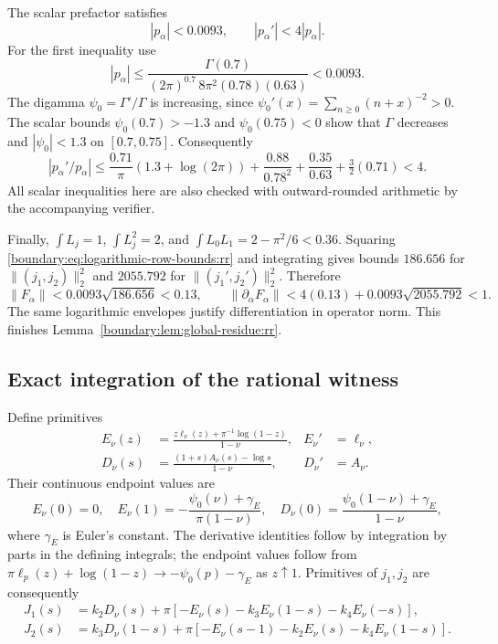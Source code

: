 The scalar prefactor satisfies
\begin{equation}\label{boundary:eq:prefactor-bounds:rr}
 |p_\alpha|<0.0093,\qquad |p_\alpha'|<4|p_\alpha|.
\end{equation}
For the first inequality use
\[
 |p_\alpha|\le
 \frac{\Gamma(0.7)}{(2\pi)^{0.7}\,8\pi^2(0.78)(0.63)}<0.0093.
\]
The digamma $\psi_0=\Gamma'/\Gamma$ is increasing, since
$\psi_0'(x)=\sum_{n\ge0}(n+x)^{-2}>0$.
The scalar bounds $\psi_0(0.7)>-1.3$ and $\psi_0(0.75)<0$ show that
$\Gamma$ decreases and $|\psi_0|<1.3$ on $[0.7,0.75]$.
Consequently
\[
 |p_\alpha'/p_\alpha|
 \le\frac{0.71}{\pi}(1.3+\log(2\pi))
       +\frac{0.88}{0.78^2}+\frac{0.35}{0.63}+\tfrac32(0.71)<4.
\]
All scalar inequalities here are also checked with outward-rounded
arithmetic by the accompanying verifier.

Finally, $\int L_j=1$, $\int L_j^2=2$, and
$\int L_0L_1=2-\pi^2/6<0.36$.
Squaring \eqref{boundary:eq:logarithmic-row-bounds:rr} and integrating
gives bounds $186.656$ for $\|(j_1,j_2)\|_2^2$ and $2055.792$ for
$\|(j_1',j_2')\|_2^2$.  Therefore
\[
 \|F_\alpha\|<0.0093\sqrt{186.656}<0.13,\qquad
 \|\partial_\alpha F_\alpha\|
 <4(0.13)+0.0093\sqrt{2055.792}<1.
\]
The same logarithmic envelopes justify differentiation in operator
norm.  This finishes Lemma~\ref{boundary:lem:global-residue:rr}.

\subsection{Exact integration of the rational witness}

Define primitives
\begin{align}
 E_\nu(z)&=\frac{z\ell_\nu(z)+\pi^{-1}\log(1-z)}{1-\nu},
 &E_\nu'&=\ell_\nu,\nonumber\\
 D_\nu(s)&=\frac{(1+s)A_\nu(s)-\log s}{1-\nu},
 &D_\nu'&=A_\nu.
 \label{boundary:eq:residue-primitives:rr}
\end{align}
Their continuous endpoint values are
\[
 E_\nu(0)=0,\quad
 E_\nu(1)=-\frac{\psi_0(\nu)+\gamma_E}{\pi(1-\nu)},\quad
 D_\nu(0)=\frac{\psi_0(1-\nu)+\gamma_E}{1-\nu},
\]
where $\gamma_E$ is Euler's constant.
The derivative identities follow by integration by parts in the
defining integrals; the endpoint values follow from
$\pi\ell_p(z)+\log(1-z)\to-\psi_0(p)-\gamma_E$ as $z\uparrow1$.
Primitives of $j_1,j_2$ are consequently
\begin{align}
 J_1(s)&=k_2D_\nu(s)+\pi[-E_\nu(s)-k_3E_\nu(1-s)-k_4E_\nu(-s)],
 \nonumber\\
 J_2(s)&=k_3D_\nu(1-s)+\pi[-E_\nu(s-1)-k_2E_\nu(s)-k_4E_\nu(1-s)].
 \label{boundary:eq:residue-row-primitives:rr}
\end{align}

